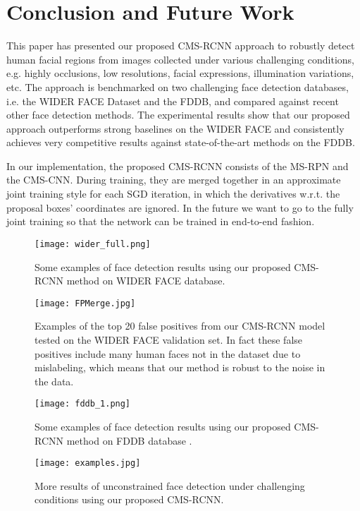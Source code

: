 \documentclass[10pt,journal,cspaper,compsoc]{IEEEtran}
\begin{document}
\section{Conclusion and Future Work} \label{sec:Concl}
This paper has presented our proposed CMS-RCNN approach to robustly detect human facial regions from images collected under various challenging conditions, e.g. highly occlusions, low resolutions, facial expressions, illumination variations, etc.
The approach is benchmarked on two challenging face detection databases, i.e. the WIDER FACE Dataset and the FDDB, and compared against recent other face detection methods. The experimental results show that our proposed approach outperforms strong baselines on the WIDER FACE and consistently achieves very competitive results against state-of-the-art methods on the FDDB.

In our implementation, the proposed CMS-RCNN consists of the MS-RPN and the CMS-CNN. During training, they are merged together in an approximate joint training style for each SGD iteration, in which the derivatives w.r.t. the proposal boxes' coordinates are ignored. In the future we want to go to the fully joint training so that the network can be trained in end-to-end fashion.

\begin{figure*}[ht]
\centering
\texttt{[image: wider\_full.png]}
\caption{Some examples of face detection results using our proposed CMS-RCNN method on WIDER FACE database\cite{yang2016wider}.}
\label{fig:face_wider2}
\end{figure*}

\begin{figure*}[ht]
\centering
\texttt{[image: FPMerge.jpg]}
\caption{Examples of the top 20 false positives from our CMS-RCNN model tested on the WIDER FACE validation set. In fact these false positives include many human faces not in the dataset due to mislabeling, which means that our method is robust to the noise in the data.}
\label{fig:false_pos}
\end{figure*}

\begin{figure*}[ht]
\centering
\texttt{[image: fddb\_1.png]}
\caption{Some examples of face detection results using our proposed CMS-RCNN method on FDDB database \cite{fddbTech}.}
\label{fig:face_fdd2}
\end{figure*}

\begin{figure*}[ht]
\centering
\texttt{[image: examples.jpg]}
\caption{More results of unconstrained face detection under challenging conditions using our proposed CMS-RCNN.}
\label{fig:examples}
\end{figure*}





\ifCLASSOPTIONcaptionsoff
  \newpage
\fi











{\small


}
\end{document}
